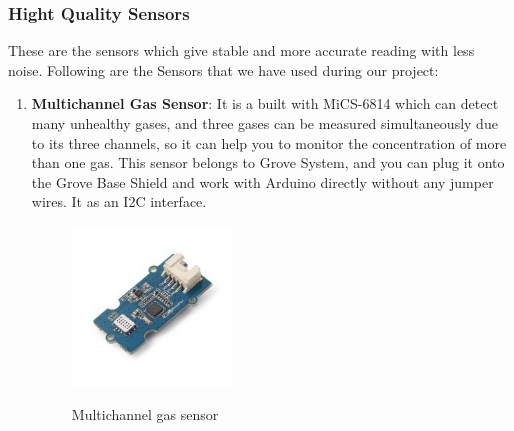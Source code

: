 \subsubsection{Hight Quality Sensors}
These are the sensors which give stable and more accurate reading with less noise. Following are the Sensors that we have used during our project:

\begin{enumerate}
	\item \textbf{Multichannel Gas Sensor}: It is a built with MiCS-6814 which can detect many unhealthy gases, and three gases can be measured simultaneously due to its three channels, so it can help you to monitor the concentration of more than one gas.  This sensor belongs to Grove System, and you can plug it onto the Grove Base Shield and work with Arduino directly without any jumper wires. It as an I2C interface.

\begin{figure}[h]
	\centering
	\includegraphics[width=0.4\textwidth]{./multi}\\[0.1in]
	\label{fig:Multichannel gas sensor}
	\caption{Multichannel gas sensor}
	\end{figure}



\end{enumerate}
